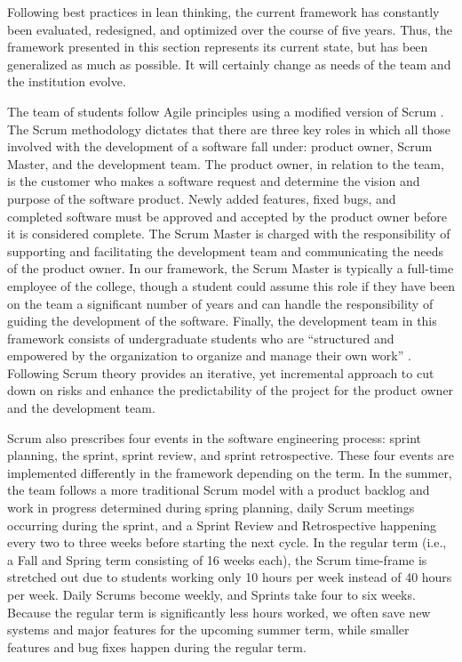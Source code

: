 Following best practices in lean thinking, the current framework has constantly been evaluated, redesigned, and optimized over the course of five years. Thus, the framework presented in this section represents its current state, but has been generalized as much as possible. It will certainly change as needs of the team and the institution evolve. 


The team of students follow Agile principles \cite{agilemanifesto} using a modified version of Scrum \cite{thescrumguide}. The Scrum methodology dictates that there are three key roles in which all those involved with the development of a software fall under: product owner, Scrum Master, and the development team. The product owner, in relation to the team, is the customer who makes a software request and determine the vision and purpose of the software product. Newly added features, fixed bugs, and completed software must be approved and accepted by the product owner before it is considered complete. The Scrum Master is charged with the responsibility of supporting and facilitating the development team and communicating the needs of the product owner. In our framework, the Scrum Master is typically a full-time employee of the college, though a student could assume this role if they have been on the team a significant number of years and can handle the responsibility of guiding the development of the software. Finally, the development team in this framework consists of undergraduate students who are ``structured and empowered by the organization to organize and manage their own work'' \cite{thescrumguide}. Following Scrum theory provides an iterative, yet incremental approach to cut down on risks and enhance the predictability of the project for the product owner and the development team.

Scrum also prescribes four events in the software engineering process: sprint planning, the sprint, sprint review, and sprint retrospective. These four events are implemented differently in the framework depending on the term.  In the summer, the team follows a more traditional Scrum model with a product backlog and work in progress determined during spring planning, daily Scrum meetings occurring during the sprint, and a Sprint Review and Retrospective happening every two to three weeks before starting the next cycle. In the regular term (i.e., a Fall and Spring term consisting of 16 weeks each), the Scrum time-frame is stretched out due to students working only 10 hours per week instead of 40 hours per week. Daily Scrums become weekly, and Sprints take four to six weeks. Because the regular term is significantly less hours worked, we often save new systems and major features for the upcoming summer term, while smaller features and bug fixes happen during the regular term.

